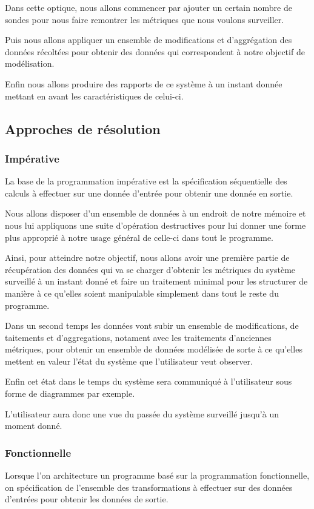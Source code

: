 \documentclass{article}
\begin{document}
Dans cette optique, nous allons commencer par ajouter un certain nombre de
sondes pour nous faire remontrer les métriques que nous voulons surveiller.

Puis nous allons appliquer un ensemble de modifications et d'aggrégation des
données récoltées pour obtenir des données qui correspondent à notre objectif
de modélisation.

Enfin nous allons produire des rapports de ce système à un instant donnée mettant
en avant les caractéristiques de celui-ci.

\subsection{Approches de résolution}
\subsubsection{Impérative}
La base de la programmation impérative est la spécification séquentielle
des calculs à effectuer sur une donnée d'entrée pour obtenir une donnée en sortie.

Nous allons disposer d'un ensemble de données à un endroit de notre mémoire et
nous lui appliquons une suite d'opération destructives pour lui donner une forme
plus approprié à notre usage général de celle-ci dans tout le programme.

Ainsi, pour atteindre notre objectif, nous allons avoir une première partie de
récupération des données qui va se charger d'obtenir les métriques du système
surveillé à un instant donné et faire un traitement minimal pour les structurer
de manière à ce qu'elles soient manipulable simplement dans tout le reste du programme.

Dans un second temps les données vont subir un ensemble de modifications, de
taitements et d'aggregations, notament avec les traitements d'anciennes métriques,
pour obtenir un ensemble de données modélisée de sorte à ce qu'elles mettent en
valeur l'état du système que l'utilisateur veut observer.

Enfin cet état dans le temps du système sera communiqué à l'utilisateur sous forme
de diagrammes par exemple.

L'utilisateur aura donc une vue du passée du système surveillé jusqu'à un moment donné.

\subsubsection{Fonctionnelle}
Lorsque l'on architecture un programme basé sur la programmation fonctionnelle,
on spécification de l'ensemble des transformations à effectuer sur des données
d'entrées pour obtenir les données de sortie.
\end{document}
